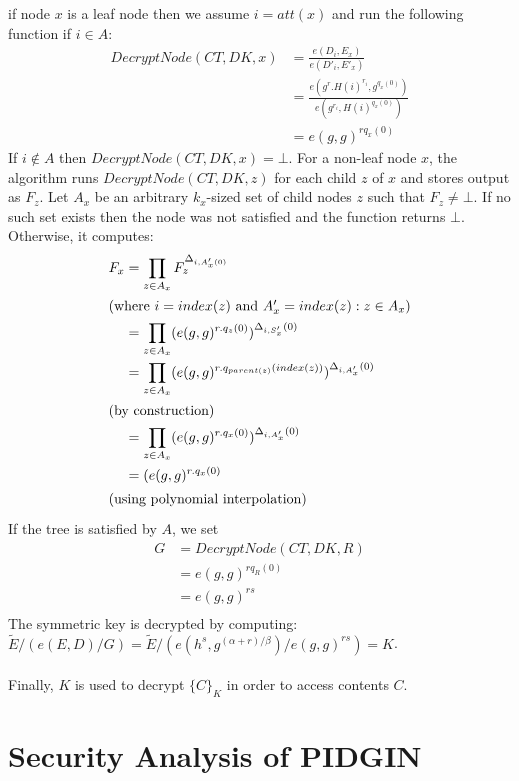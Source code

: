 \documentclass[epsfig,a4paper,11pt,titlepage]{book}
\numberwithin{algorithm}{chapter}
\begin{document}
 if node $x$ is a leaf node then we assume $i = att(x)$ and run the following function if $i \in A$:
\begin{align*}
DecryptNode(CT, DK, x) &= \frac{e(D_i, E_x)}{e(D'_i, E'_x)} \\
 &= \frac{e(g^r . H(i)^{r_i}, g^{q_x (0)})}{e(g^{r_i}, H(i)^{q_x (0)})} \\
 &= e(g, g)^{r q_x (0)}
\end{align*}
If $i \not\in A$ then $DecryptNode(CT, DK, x) = \bot$. 
For a non-leaf node $x$, the algorithm runs $DecryptNode(CT, DK, z)$ for each child $z$ of $x$ and stores output as $F_z$. Let $A_x$ be an arbitrary $k_x$-sized set of child nodes $z$ such that $F_z \neq \bot$. If no such set exists then the node was not satisfied and the function returns $\bot$. Otherwise, it computes:
\begin{align*}
F_x &= \prod_{z \in A_{x}} F_z^{\Delta_{i,A'_x (0)}} \\ 
\intertext{(where $i = index(z)$ and $A'_x = index(z) : z \in A_x$)}
&= \prod_{z \in A_x} (e(g, g)^{r . q_z(0)})^{\Delta_{i, S'_x}(0)} \\
&= \prod_{z \in A_x} (e(g, g)^{r . q_{parent(z)}(index(z))})^{\Delta_{i, A'_x}(0)} \\
\intertext{(by construction)}
&= \prod_{z \in A_x} (e(g, g)^{r . q_x (0)})^{\Delta_{i, A'_x} (0)} \\
&= (e(g, g)^{r . q_x (0)} \\ \intertext{(using polynomial interpolation)}
\end{align*}
If the tree is satisfied by $A$, we set
\begin{align*}
G &= DecryptNode(CT, DK, R) \\
&= e(g, g)^{r q_R (0)} \\
&= e(g, g)^{rs} \\ 
\end{align*}
The symmetric key is decrypted by computing: \\
$\tilde{E} / (e(E, D)/G) = \tilde{E} / (e(h^s, g^{(\alpha + r) / \beta}) / e(g, g)^{rs}) = K$. \\ \\
Finally, $K$ is used to decrypt $\{C\}_K$ in order to access contents $C$.


\section[Security Analysis of PIDGIN]{Security Analysis of \gls{PIDGIN}}
\label{sec:pidgin-security-analysis}
\end{document}
